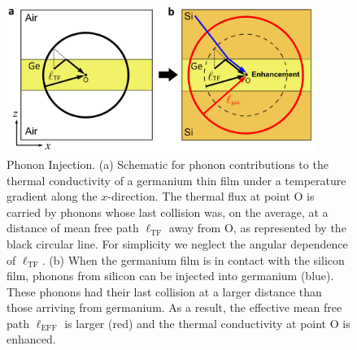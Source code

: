\begin{figure}[hbt]
  \centering \includegraphics[width=0.90\textwidth]{figures/ch5/Fig3-enh.jpg}
  \caption{Phonon Injection. (a) Schematic for phonon contributions to the thermal conductivity of a germanium thin film under a temperature gradient along the $x$-direction. The thermal flux at point O is carried by phonons whose last collision was, on the average, at a distance of mean free path $\ell_{\text{TF}}$ away from O, as represented by the black circular line. For simplicity we neglect the angular dependence of $\ell_{\text{TF}}$. (b) When the germanium film is in contact with the silicon film, phonons from silicon can be injected into germanium (blue). These phonons had their last collision at a larger distance than those arriving from germanium. As a result, the effective mean free path $\ell_{\text{EFF}}$ is larger (red) and the thermal conductivity at point O is enhanced.}
    \label{fig:ch5-enh3}
\end{figure}

